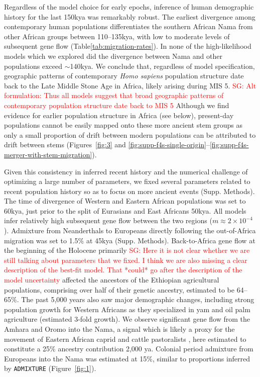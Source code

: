 \documentclass{article}
\newcommand{\sgcomment}[1]{{\textcolor{red}{SG: #1}}}
\begin{document}
Regardless of the model choice for early epochs, inference of human demographic
history for the last 150kya was remarkably robust. The earliest divergence among
contemporary human populations differentiates the southern African Nama from
other African groups between 110--135kya, with low to moderate levels of
subsequent gene flow (Table\ref{tab:migration-rates}). In none of the
high-likelihood models which we explored did the divergence between Nama and
other populations exceed $\sim$140kya. We conclude that, regardless of model
specification, geographic patterns of contemporary \emph{Homo sapiens} population structure
date back to the Late Middle Stone Age in Africa, likely arising during MIS 5.
\sgcomment{Alt formulation: Thus all models suggest that broad geographic patterns of contemporary population structure date back to MIS 5}
Although we find evidence for earlier population structure in Africa (see
below), present-day populations cannot be easily mapped onto these more ancient
stem groups as only a small proportion of drift between modern populations can
be attributed to drift between stems (Figures~\ref{fig:3} and
\ref{fig:supp-f4s-single-origin}--\ref{fig:supp-f4s-merger-with-stem-migration}). 

Given this consistency in inferred recent history and the numerical challenge
of optimizing a large number of parameters, we fixed several parameters related
to recent population history so as to focus on more ancient events (Supp.
Methods). The time of divergence of Western and Eastern African populations was
set to 60kya, just prior to the split of Eurasians and East Africans 50kya. All
models infer relatively high subsequent gene flow between the two regions
($m\approx2\times10^{-4}$). Admixture from Neanderthals to Europeans directly
following the out-of-Africa migration was set to 1.5\% at 45kya (Supp.
Methods). Back-to-Africa gene flow at the beginning of the Holocene primarily
\sgcomment{Here it is not clear whether we are still talking about parameters that we fixed. I think we are also missing a clear description of the best-fit model. That *could* go after the description of the model uncertainty}
affected the ancestors of the Ethiopian agricultural populations, comprising
over half of their genetic ancestry, estimated to be 64--65\%. The past 5,000
years also saw major demographic changes, including strong population growth
for Western Africans as they specialized in yam and oil palm agriculture
(estimated 3-fold growth). We observe significant gene flow from the Amhara and
Oromo into the Nama, a signal which is likely a proxy for the movement of
Eastern African caprid and cattle pastoralists
\citep{Henn2008-xo,Breton2014-xb}, here estimated to constitute a 25\% ancestry
contribution 2,000 ya. Colonial period admixture from Europeans into the Nama
was estimated at 15\%, similar to proportions inferred by \texttt{ADMIXTURE}
\citep{Alexander2009-sw} (Figure~\ref{fig:1}).
\end{document}
